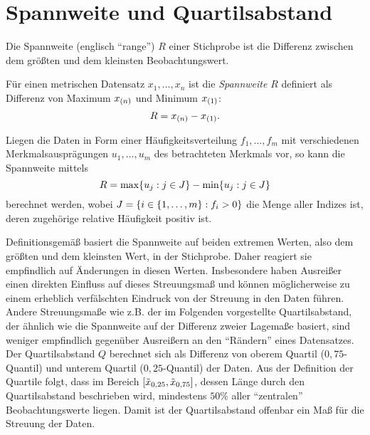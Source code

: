 \documentclass{lecture}
\begin{document}
    \section*{Spannweite und Quartilsabstand}

    Die Spannweite (englisch ``range'') \(R\) einer Stichprobe ist die Differenz zwischen dem größten und dem kleinsten Beobachtungswert.

    \begin{definition}
        Für einen metrischen Datensatz \(x_1, \ldots, x_n\) ist die \emph{Spannweite} \(R\) definiert als Differenz von Maximum \(x_{\parentheses*{n}}\) und Minimum \(x_{\parentheses*{1}}\):
        \[
            R = x_{\parentheses*{n}} - x_{\parentheses*{1}}.
        \]
    \end{definition}

    \begin{calcrule}
        Liegen die Daten in Form einer Häufigkeitsverteilung \(f_1, \ldots, f_m\) mit verschiedenen Merkmalsausprägungen \(u_1, \ldots, u_m\) des betrachteten Merkmals vor, so kann die Spannweite mittels
        \[
            R = \max\braces*{u_j : j \in J} - \min\braces*{u_j : j \in J}
        \]
        berechnet werden, wobei \(J = \braces*{i \in \braces*{1, \ldots, m} : f_i > 0}\) die Menge aller Indizes ist, deren zugehörige relative Häufigkeit positiv ist.
    \end{calcrule}

    Definitionsgemäß basiert die Spannweite auf beiden extremen Werten, also dem größten und dem kleinsten Wert, in der Stichprobe.
    Daher reagiert sie empfindlich auf Änderungen in diesen Werten.
    Insbesondere haben Ausreißer einen direkten Einfluss auf dieses Streuungsmaß und können möglicherweise zu einem erheblich verfälschten Eindruck von der Streuung in den Daten führen.
    Andere Streuungsmaße wie z.B. der im Folgenden vorgestellte Quartilsabstand, der ähnlich wie die Spannweite auf der Differenz zweier Lagemaße basiert, sind weniger empfindlich gegenüber Ausreißern an den ``Rändern'' eines Datensatzes.
    Der Quartilsabstand \(Q\) berechnet sich als Differenz von oberem Quartil (\(0,75\)-Quantil) und unterem Quartil (\(0,25\)-Quantil) der Daten.
    Aus der Definition der Quartile folgt, dass im Bereich \(\brackets*{\tilde{x}_{0,25}, \tilde{x}_{0,75}}\), dessen Länge durch den Quartilsabstand beschrieben wird, mindestens \(50\%\) aller ``zentralen'' Beobachtungswerte liegen.
    Damit ist der Quartilsabstand offenbar ein Maß für die Streuung der Daten.
\end{document}
